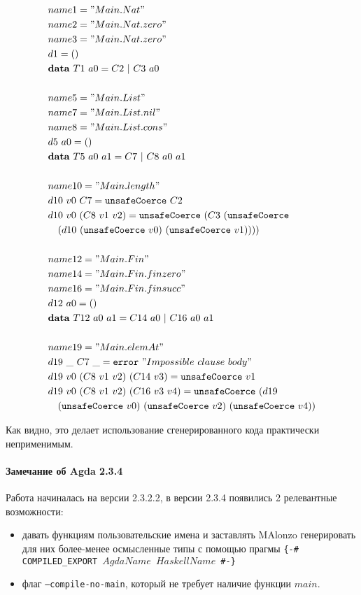 \begin{align*}
&name1 = "Main.Nat"\\
&name2 = "Main.Nat.zero"\\
&name3 = "Main.Nat.zero"\\
&d1 = ()\\
&\mathbf{data}\ T1\ a0 = C2\ |\ C3\ a0\\
\\
&name5 = "Main.List"\\
&name7 = "Main.List.nil"\\
&name8 = "Main.List.cons"\\
&d5\ a0 = ()\\
&\mathbf{data}\ T5\ a0\ a1 = C7\ |\ C8\ a0\ a1\\
\\
&name10 = "Main.length"\\
&d10\ v0\ C7 = \texttt{unsafeCoerce}\ C2\\
&d10\ v0\ (C8\ v1\ v2) = \texttt{unsafeCoerce}\ (C3\ (\texttt{unsafeCoerce}\\
&\quad(d10\ (\texttt{unsafeCoerce}\ v0)\ (\texttt{unsafeCoerce}\ v1))))\\
\\
&name12 = "Main.Fin"\\
&name14 = "Main.Fin.finzero"\\
&name16 = "Main.Fin.finsucc"\\
&d12\ a0 = ()\\
&\mathbf{data}\ T12\ a0\ a1 = C14\ a0\ |\ C16\ a0\ a1\\
\\
&name19 = "Main.elemAt"\\
&d19\ \_\ C7\ \_ = \texttt{error}\ "Impossible\ clause\ body"\\
&d19\ v0\ (C8\ v1\ v2)\ (C14\ v3) = \texttt{unsafeCoerce}\ v1\\
&d19\ v0\ (C8\ v1\ v2)\ (C16\ v3\ v4) = \texttt{unsafeCoerce}\ (d19\\
&\quad(\texttt{unsafeCoerce}\ v0)\ (\texttt{unsafeCoerce}\ v2)\ (
   \texttt{unsafeCoerce}\ v4))
\end{align*}

Как видно, это делает использование сгенерированного кода
практически неприменимым.

\paragraph{Замечание об Agda 2.3.4}

Работа начиналась на версии 2.3.2.2, в версии 2.3.4 появились 2 релевантные возможности:
\begin{itemize}
\item давать функциям пользовательские имена и заставлять MAlonzo генерировать для них
      более-менее осмысленные типы с помощью прагмы
      \texttt{\{-\# COMPILED\_EXPORT \(AgdaName\) \(HaskellName\) \#-\}}
\item флаг \texttt{---compile-no-main}, который не требует наличие функции \(main\).
\end{itemize}

